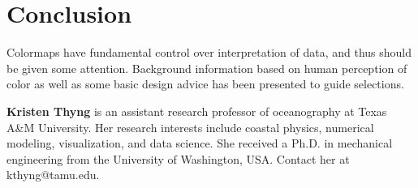 \documentclass[10pt,journal,compsoc]{IEEEtran}
\begin{document}
\section{Conclusion}

Colormaps have fundamental control over interpretation of data, and thus should be given some attention. Background information based on human perception of color as well as some basic design advice has been presented to guide selections.






\bigskip

\textbf{Kristen Thyng} is an assistant research professor of oceanography at Texas A\&M University. Her research interests include coastal physics, numerical modeling, visualization, and data science. She received a Ph.D. in mechanical engineering from the University of Washington, USA. Contact her at kthyng@tamu.edu.
\end{document}
